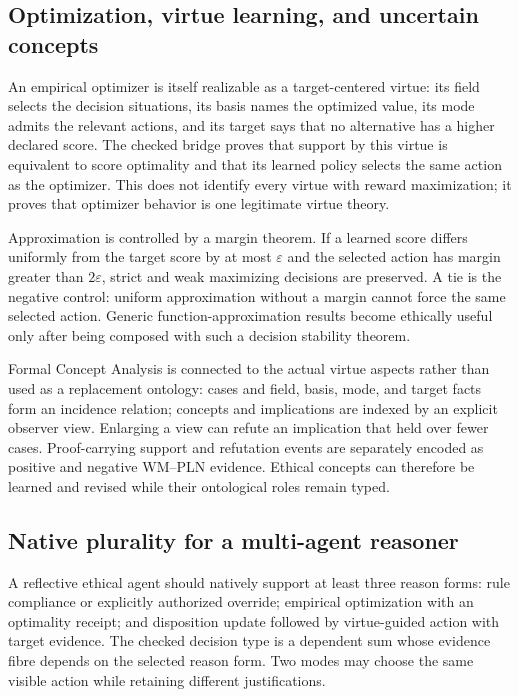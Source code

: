 \documentclass[11pt]{article}
\theoremstyle{definition}
\theoremstyle{remark}
\begin{document}
\subsection{Optimization, virtue learning, and uncertain concepts}

An empirical optimizer is itself realizable as a target-centered virtue: its
field selects the decision situations, its basis names the optimized value, its
mode admits the relevant actions, and its target says that no alternative has a
higher declared score.  The checked bridge proves that support by this virtue is
equivalent to score optimality and that its learned policy selects the same
action as the optimizer.  This does not identify every virtue with reward
maximization; it proves that optimizer behavior is one legitimate virtue theory.

Approximation is controlled by a margin theorem.  If a learned score differs
uniformly from the target score by at most $\varepsilon$ and the selected action
has margin greater than $2\varepsilon$, strict and weak maximizing decisions are
preserved.  A tie is the negative control: uniform approximation without a
margin cannot force the same selected action.  Generic function-approximation
results become ethically useful only after being composed with such a decision
stability theorem.

Formal Concept Analysis is connected to the actual virtue aspects rather than
used as a replacement ontology: cases and field, basis, mode, and target facts
form an incidence relation; concepts and implications are indexed by an explicit
observer view.  Enlarging a view can refute an implication that held over fewer
cases.  Proof-carrying support and refutation events are separately encoded as
positive and negative WM--PLN evidence.  Ethical concepts can therefore be
learned and revised while their ontological roles remain typed.

\subsection{Native plurality for a multi-agent reasoner}

A reflective ethical agent should natively support at least three reason forms:
rule compliance or explicitly authorized override; empirical optimization with
an optimality receipt; and disposition update followed by virtue-guided action
with target evidence.  The checked decision type is a dependent sum whose
evidence fibre depends on the selected reason form.  Two modes may choose the
same visible action while retaining different justifications.
\end{document}
